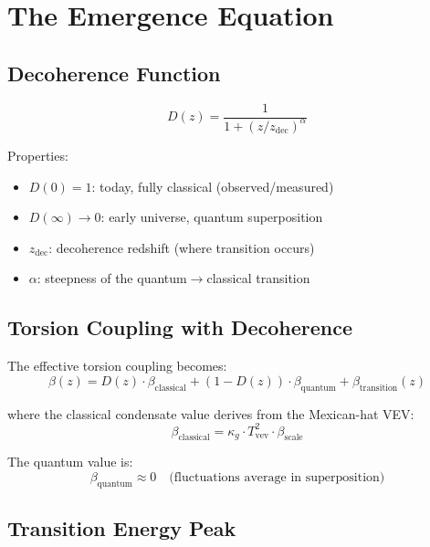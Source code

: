 \documentclass[twocolumn,prd,superscriptaddress,nofootinbib]{revtex4-2}
\begin{document}
\section{The Emergence Equation}

\subsection{Decoherence Function}

\begin{equation}
\boxed{D(z) = \frac{1}{1 + (z/z_\text{dec})^\alpha}}
\label{eq:decoherence}
\end{equation}

Properties:
\begin{itemize}
\item $D(0) = 1$: today, fully classical (observed/measured)
\item $D(\infty) \to 0$: early universe, quantum superposition
\item $z_\text{dec}$: decoherence redshift (where transition occurs)
\item $\alpha$: steepness of the quantum$\to$classical transition
\end{itemize}

\subsection{Torsion Coupling with Decoherence}

The effective torsion coupling becomes:
\begin{equation}
\beta(z) = D(z)\cdot\beta_\text{classical} + (1 - D(z))\cdot\beta_\text{quantum} + \beta_\text{transition}(z)
\label{eq:beta_emergence}
\end{equation}

where the classical condensate value derives from the Mexican-hat VEV:
\begin{equation}
\beta_\text{classical} = \kappa_g \cdot T_\text{vev}^2 \cdot \beta_\text{scale}
\end{equation}

The quantum value is:
\begin{equation}
\beta_\text{quantum} \approx 0 \quad \text{(fluctuations average in superposition)}
\end{equation}

\subsection{Transition Energy Peak}
\end{document}
